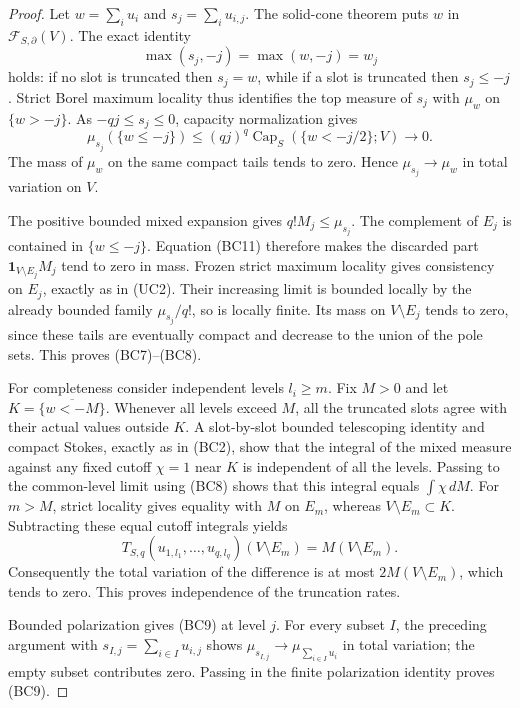 \documentclass[11pt,a4paper]{article}
\numberwithin{equation}{section}
\theoremstyle{definition}
\theoremstyle{remark}
\begin{document}
\begin{proof}
Let $w=\sum_i u_i$ and $s_j=\sum_i u_{i,j}$. The solid-cone
theorem puts $w$ in $\mathcal F_{S,\partial}(V)$. The exact identity
\[
                      \max(s_j,-j)=\max(w,-j)=w_j
 \tag{BC10}
\]
holds: if no slot is truncated then $s_j=w$, while if a slot is
truncated then $s_j\leq-j$. Strict Borel maximum locality thus
identifies the top measure of $s_j$ with $\mu_w$ on $\{w>-j\}$.
As $-qj\leq s_j\leq0$, capacity normalization gives
\[
 \mu_{s_j}(\{w\leq-j\})
       \leq(qj)^q\operatorname{Cap}_S(\{w<-j/2\};V)
                                     \longrightarrow0.
 \tag{BC11}
\]
The mass of $\mu_w$ on the same compact tails tends to zero.
Hence $\mu_{s_j}\to\mu_w$ in total variation on $V$.

The positive bounded mixed expansion gives $q!M_j\leq\mu_{s_j}$.
The complement of $E_j$ is contained in $\{w\leq-j\}$.
Equation (BC11) therefore makes the discarded part
$\mathbf1_{V\setminus E_j}M_j$ tend to zero in mass. Frozen
strict maximum locality gives consistency on $E_j$, exactly as
in (UC2). Their increasing limit is bounded locally by the
already bounded family $\mu_{s_j}/q!$, so is locally finite.
Its mass on $V\setminus E_j$ tends to zero, since these tails
are eventually compact and decrease to the union of the pole sets.
This proves (BC7)--(BC8).

For completeness consider independent levels $l_i\geq m$. Fix
$M>0$ and let $K=\overline{\{w<-M\}}$. Whenever all levels
exceed $M$, all the truncated slots agree with their actual values
outside $K$. A slot-by-slot bounded telescoping identity and
compact Stokes, exactly as in (BC2), show that the integral of
the mixed measure against any fixed cutoff $\chi=1$ near $K$
is independent of all the levels. Passing to the common-level
limit using (BC8) shows that this integral equals $\int\chi\,dM$.
For $m>M$, strict locality gives equality with $M$ on $E_m$,
whereas $V\setminus E_m\subset K$. Subtracting these equal
cutoff integrals yields
\[
 T_{S,q}(u_{1,l_1},\ldots,u_{q,l_q})(V\setminus E_m)
                            =M(V\setminus E_m).
\]
Consequently the total variation of the difference is at most
$2M(V\setminus E_m)$, which tends to zero. This proves independence
of the truncation rates.

Bounded polarization gives (BC9) at level $j$. For every subset
$I$, the preceding argument with $s_{I,j}=\sum_{i\in I}u_{i,j}$
shows $\mu_{s_{I,j}}\to\mu_{\sum_{i\in I}u_i}$ in total
variation; the empty subset contributes zero. Passing in the finite
polarization identity proves (BC9).


\end{proof}
\end{document}
